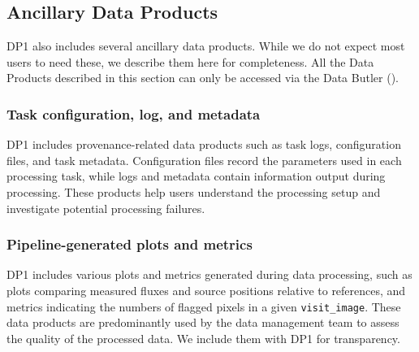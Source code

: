 



\subsection{Ancillary Data Products
\label{subsec:ancilliary}}
DP1 also includes several ancillary data products. While we do not expect most users to need these, we describe them here for completeness. All the Data Products described in this section can only be accessed via the Data Butler ().

\subsubsection{Task configuration, log, and metadata}
DP1 includes provenance-related data products such as task logs, configuration files, and task metadata. 
Configuration files record the parameters used in each processing task, while logs and metadata contain information output during processing. These products help users understand the processing setup and investigate potential processing failures.

\subsubsection{Pipeline-generated plots and metrics}
DP1 includes various plots and metrics generated during data processing, such as  plots comparing measured fluxes and source positions relative to references, and metrics indicating the numbers of flagged pixels in a given \texttt{visit\_image}. These data products are predominantly used by the data management team to assess the quality of the processed data. We include them with DP1 for transparency. 

